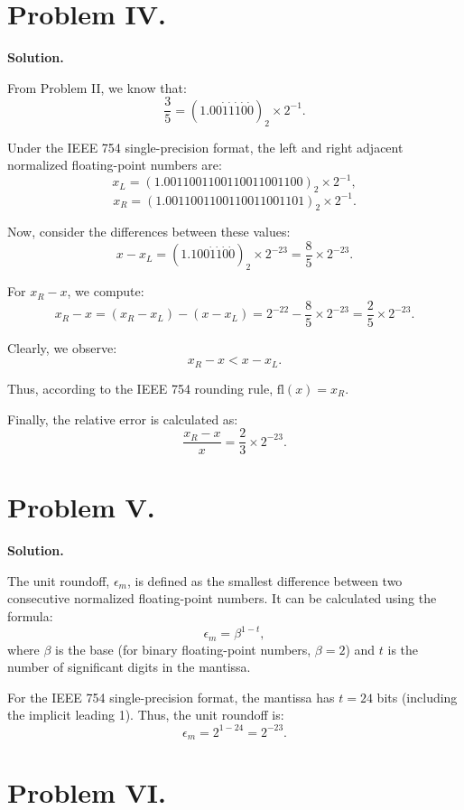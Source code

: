 \documentclass[a4paper]{article}
\begin{document}
\section*{Problem IV.}

\textbf{Solution.}

From Problem II, we know that:
\[
\frac{3}{5} = (1.00\dot{1}\dot{1}\dot{1}\dot{0}\dot{0})_2 \times 2^{-1}.
\]

Under the IEEE 754 single-precision format, the left and right adjacent normalized floating-point numbers are:
\[
x_{L} = (1.0011001100110011001100)_2 \times 2^{-1},
\]
\[
x_{R} = (1.0011001100110011001101)_2 \times 2^{-1}.
\]

Now, consider the differences between these values:
\[
x - x_{L} = (1.100\dot{1}\dot{1}\dot{0}\dot{0})_2 \times 2^{-23} = \frac{8}{5} \times 2^{-23}.
\]

For \(x_{R} - x\), we compute:
\[
x_{R} - x = (x_{R} - x_{L}) - (x - x_{L})  = 2^{-22} - \frac{8}{5} \times 2^{-23} = \frac{2}{5} \times 2^{-23}.
\]

Clearly, we observe:
\[
x_{R} - x < x - x_{L}.
\]

Thus, according to the IEEE 754 rounding rule, \(\text{fl}(x) = x_{R}\).

Finally, the relative error is calculated as:
\[
\frac{x_{R} - x}{x} = \frac{2}{3} \times 2^{-23}.
\]


\section*{Problem V.}

\textbf{Solution.}

The unit roundoff, \(\epsilon_m\), is defined as the smallest difference between two consecutive normalized floating-point numbers. It can be calculated using the formula:  
\[
\epsilon_m = \beta^{1-t},
\]
where \(\beta\) is the base (for binary floating-point numbers, \(\beta = 2\)) and \(t\) is the number of significant digits in the mantissa.

For the IEEE 754 single-precision format, the mantissa has \(t = 24\) bits (including the implicit leading 1). Thus, the unit roundoff is:  
\[
\epsilon_m = 2^{1-24} = 2^{-23}.
\]



\section*{Problem VI.}
\end{document}

